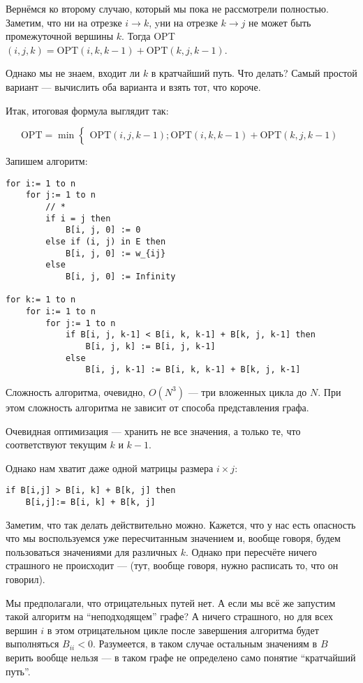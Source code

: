 Вернёмся ко второму случаю, который мы пока не рассмотрели полностью. Заметим, что ни на отрезке $i \longrightarrow k$, yни на отрезке $k \longrightarrow j$ не может быть промежуточной вершины $k$. Тогда OPT$(i, j, k) = \mathrm{OPT}(i, k, k-1) + \mathrm{OPT}(k, j, k-1)$.

Однако мы не знаем, входит ли $k$ в кратчайший путь. Что делать? Самый простой вариант --- вычислить оба варианта и взять тот, что короче.

Итак, итоговая формула выглядит так:

\[
    \mathrm{OPT} = \min
    \begin{cases}
        \mathrm{OPT}(i, j, k-1);
        \mathrm{OPT}(i, k, k-1) + \mathrm{OPT}(k, j, k-1)
    \end{cases}
\]

Запишем алгоритм:

\begin{lstlisting}
for i:= 1 to n
    for j:= 1 to n
        // *
        if i = j then
            B[i, j, 0] := 0
        else if (i, j) in E then
            B[i, j, 0] := w_{ij}
        else
            B[i, j, 0] := Infinity

for k:= 1 to n
    for i:= 1 to n
        for j:= 1 to n
            if B[i, j, k-1] < B[i, k, k-1] + B[k, j, k-1] then
                B[i, j, k] := B[i, j, k-1]
            else
                B[i, j, k-1] := B[i, k, k-1] + B[k, j, k-1]
\end{lstlisting}

Сложность алгоритма, очевидно, $O(N^3)$ --- три вложенных цикла до $N$. При этом сложность алгоритма не зависит от способа представления графа.

Очевидная оптимизация --- хранить не все значения, а только те, что соответствуют текущим $k$ и $k-1$.

Однако нам хватит даже одной матрицы размера $i\times j$:

\begin{lstlisting}
if B[i,j] > B[i, k] + B[k, j] then
    B[i,j]:= B[i, k] + B[k, j]
\end{lstlisting}

Заметим, что так делать действительно можно. Кажется, что у нас есть опасность что мы воспользуемся уже пересчитанным значением и, вообще говоря, будем пользоваться значениями для различных $k$. Однако при пересчёте ничего страшного не происходит --- (тут, вообще говоря, нужно расписать то, что он говорил).

Мы предполагали, что отрицательных путей нет. А если мы всё же запустим такой алгоритм на ``неподходящем'' графе? А ничего страшного, но для всех вершин $i$ в этом отрицательном цикле после завершения алгоритма будет выполняться $B_{ii} < 0$. Разумеется, в таком случае остальным значениям в $B$ верить вообще нельзя --- в таком графе не определено само понятие ``кратчайший путь''.


